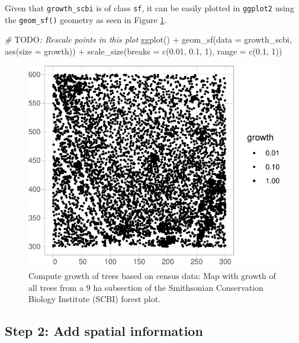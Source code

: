 \documentclass[12pt]{article}
\newenvironment{Shaded}{\begin{snugshade}}{\end{snugshade}}
\newcommand{\AlertTok}[1]{\textcolor[rgb]{0.94,0.16,0.16}{#1}}
\newcommand{\AttributeTok}[1]{\textcolor[rgb]{0.77,0.63,0.00}{#1}}
\newcommand{\CommentTok}[1]{\textcolor[rgb]{0.56,0.35,0.01}{\textit{#1}}}
\newcommand{\DecValTok}[1]{\textcolor[rgb]{0.00,0.00,0.81}{#1}}
\newcommand{\FloatTok}[1]{\textcolor[rgb]{0.00,0.00,0.81}{#1}}
\newcommand{\FunctionTok}[1]{\textcolor[rgb]{0.00,0.00,0.00}{#1}}
\newcommand{\NormalTok}[1]{#1}
\newcommand{\SpecialCharTok}[1]{\textcolor[rgb]{0.00,0.00,0.00}{#1}}
\begin{document}
Given that \texttt{growth\_scbi} is of class \texttt{sf}, it can be
easily plotted in \texttt{ggplot2} using the \texttt{geom\_sf()}
geometry as seen in Figure \ref{fig:scbi-trees}.

\begin{Shaded}
\begin{Highlighting}[]
\CommentTok{\# }\AlertTok{TODO}\CommentTok{: Rescale points in this plot}
\FunctionTok{ggplot}\NormalTok{() }\SpecialCharTok{+}
  \FunctionTok{geom\_sf}\NormalTok{(}\AttributeTok{data =}\NormalTok{ growth\_scbi, }\FunctionTok{aes}\NormalTok{(}\AttributeTok{size =}\NormalTok{ growth)) }\SpecialCharTok{+} 
  \FunctionTok{scale\_size}\NormalTok{(}\AttributeTok{breaks =} \FunctionTok{c}\NormalTok{(}\FloatTok{0.01}\NormalTok{, }\FloatTok{0.1}\NormalTok{, }\DecValTok{1}\NormalTok{), }\AttributeTok{range =} \FunctionTok{c}\NormalTok{(}\FloatTok{0.1}\NormalTok{, }\DecValTok{1}\NormalTok{))}
\end{Highlighting}
\end{Shaded}

\begin{figure}

{\centering \includegraphics[width=0.66\linewidth]{Figures/scbi-trees-1} 

}

\caption{Compute growth of trees based on census data: Map with growth of all trees from a 9 ha subsection of the Smithsonian Conservation Biology Institute (SCBI) forest plot.}\label{fig:scbi-trees}
\end{figure}

\hypertarget{spatial-information}{%
\subsection{Step 2: Add spatial information}\label{spatial-information}}
\end{document}
